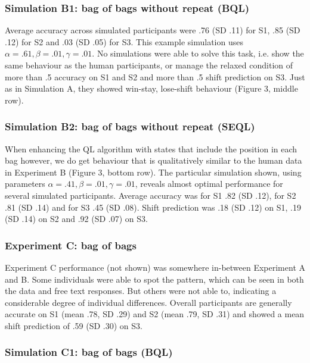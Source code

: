 \documentclass[10pt,letterpaper]{article}
\begin{document}
\subsubsection{Simulation B1: bag of bags without repeat (BQL)}

Average accuracy across simulated participants were .76 (SD .11) for S1, .85 (SD .12) for S2 and .03 (SD .05) for S3. This example simulation uses $\alpha = .61, \beta = .01, \gamma = .01$. No simulations were able to solve this task, i.e. show the same behaviour as the human participants, or manage the relaxed condition of more than .5 accuracy on S1 and S2 and more than .5 shift prediction on S3. Just as in Simulation A, they showed win-stay, lose-shift behaviour (Figure 3, middle row). 

\subsubsection{Simulation B2: bag of bags without repeat (SEQL)}

When enhancing the QL algorithm with states that include the position in each bag however, we do get behaviour that is qualitatively similar to the human data in Experiment B (Figure 3, bottom row). The particular simulation shown, using parameters $\alpha = .41, \beta = .01, \gamma = .01$, reveals almost optimal performance for several simulated participants. Average accuracy was for S1 .82 (SD .12), for S2 .81 (SD .14) and for S3 .45 (SD .08). Shift prediction was .18 (SD .12) on S1, .19 (SD .14) on S2 and .92 (SD .07) on S3.

\subsubsection{Experiment C: bag of bags}

Experiment C performance (not shown) was somewhere in-between Experiment A and B. Some individuals were able to spot the pattern, which can be seen in both the data and free text responses. But others were not able to, indicating a considerable degree of individual differences. Overall participants are generally accurate on S1 (mean .78, SD .29) and S2 (mean .79, SD .31) and showed a mean shift prediction of .59 (SD .30) on S3.

\subsubsection{Simulation C1: bag of bags (BQL)}
\end{document}
